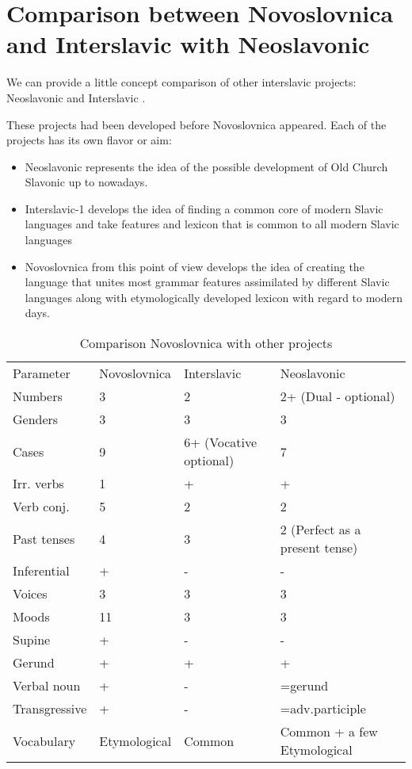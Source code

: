 \section{Comparison between Novoslovnica and Interslavic with Neoslavonic}

We can provide a little concept comparison of other interslavic projects: Neoslavonic \cite{neoslavonic} and Interslavic \cite{interslavic}.

These projects had been developed before Novoslovnica appeared. Each of the projects has its own flavor or aim:

\begin{itemize}
	\item Neoslavonic represents the idea of the possible development of Old Church Slavonic up to nowadays.
	\item Interslavic-1 develops the idea of finding a common core of modern Slavic languages and take features and lexicon that is common to all modern Slavic languages
	\item Novoslovnica from this point of view develops the idea of creating the language that unites most grammar features assimilated by different Slavic languages along with etymologically developed lexicon with regard to modern days.
\end{itemize}

\begin{table}[!htb]
	\caption{Comparison Novoslovnica with other projects}
	\begin{tabular}{lp{5em}p{5em}p{5em}}
		Parameter & Novoslovnica & Interslavic & Neoslavonic \\
		Numbers & 3 & 2 & 2+ (Dual - optional) \\
		Genders & 3 & 3 & 3 \\
		Cases & 9 & 6+ (Vocative optional) & 7 \\
		Irr. verbs & 1 & + & + \\
		Verb conj. & 5 & 2 & 2 \\
		Past tenses & 4 & 3 & 2 (Perfect as a present tense)\\
		Inferential & + & - & - \\
		Voices & 3 & 3 & 3 \\
		Moods & 11 & 3 & 3 \\
		Supine & + & - & - \\
		Gerund & + & + & + \\
		Verbal noun & + & - & =gerund \\
		Transgressive & + & - & =adv.participle \\
		Vocabulary & Etymological & Common & Common + a few Etymological 
	\end{tabular}
\end{table}